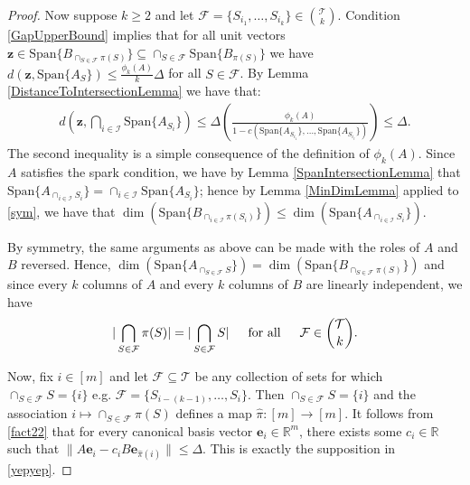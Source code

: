 \documentclass[journal, onecolumn]{IEEEtran}
\begin{document}
\begin{proof}
Now suppose $k \geq 2$ and let $\mathcal{F} = \{S_{i_1}, \ldots, S_{i_k}\} \in {\mathcal{T} \choose k}$. Condition \eqref{GapUpperBound} implies that for all unit vectors $\mathbf{z} \in  \text{Span}\{B_{\cap_{S \in \mathcal{F}}\pi(S)}\} \subseteq \cap_{S \in \mathcal{F}} \text{Span}\{B_{\pi(S)}\}$ we have $d(\mathbf{z}, \text{Span}\{A_{S}\}) \leq \frac{\phi_k(A)}{k} \Delta$ for all $S \in \mathcal{F}$. By Lemma \ref{DistanceToIntersectionLemma} we have that:
\begin{align}\label{sym}
d\left( \mathbf{z}, \bigcap_{i \in \mathcal{I}} \text{Span}\{A_{S_i}\} \right) \leq \Delta \left( \frac{\phi_k(A)}{1 - c(\text{Span}\{A_{S_{i_1}}\}, \ldots, \text{Span}\{A_{S_{i_\ell}}\})} \right) \leq \Delta.
\end{align}
%
The second inequality is a simple consequence of the definition of $\phi_k(A)$. Since $A$ satisfies the spark condition, we have by Lemma \ref{SpanIntersectionLemma} that $\text{Span}\{A_{\cap_{i \in \mathcal{I}} S_{i}}\} = \cap_{i \in \mathcal{I}} \text{Span}\{A_{S_i}\}$; hence by Lemma \ref{MinDimLemma} applied to \eqref{sym}, we have that $\dim(\text{Span}\{B_{\cap_{i \in \mathcal{I}}\pi(S_{i})}\}) \leq \dim(\text{Span}\{A_{\cap_{i \in \mathcal{I}} S_{i}}\})$.

By symmetry, the same arguments as above can be made with the roles of $A$ and $B$ reversed. Hence, $\dim(\text{Span}\{A_{\cap_{S \in \mathcal{F}}S}\}) = \dim(\text{Span}\{B_{\cap_{S \in \mathcal{F}}\pi(S)}\})$ and since every $k$ columns of $A$ and every $k$ columns of $B$ are linearly independent, we have
\begin{align}\label{fact22}
|\bigcap_{S \in \mathcal{F}} \pi(S)| = |\bigcap_{S \in \mathcal{F}} S | \indent \text{for all} \indent \mathcal{F} \in {\mathcal{T} \choose k}.
\end{align}

Now, fix $i \in [m]$ and let $\mathcal{F} \subseteq \mathcal{T}$ be any collection of sets for which $\cap_{S \in \mathcal{F}} S = \{i\}$ e.g. $\mathcal{F} = \{S_{i-(k-1)}, \ldots, S_i\}$. Then $\cap_{S \in \mathcal{F}} S = \{i\}$ and the association $i \mapsto \cap_{S \in \mathcal{F}} \pi(S)$ defines a map $\hat \pi: [m] \to [m]$. It follows from \eqref{fact22} that for every canonical basis vector $\mathbf{e}_i \in \mathbb{R}^m$, there exists some $c_i \in \mathbb{R}$ such that $\|A\mathbf{e}_i - c_iB\mathbf{e}_{\hat \pi(i)}\| \leq \Delta$. This is exactly the supposition in \eqref{yepyep}.
\end{proof}
\end{document}
